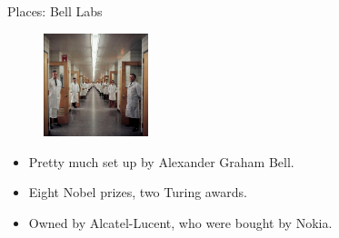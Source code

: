 \begin{frame}{Places: Bell Labs}
  \begin{figure}
    \includegraphics[height=3cm]{img/bell-labs.jpg}
  \end{figure}
  \begin{itemize}
    \item Pretty much set up by Alexander Graham Bell.
    \item Eight Nobel prizes, two Turing awards.
    \item Owned by Alcatel-Lucent, who were bought by Nokia.
  \end{itemize}
\end{frame}
